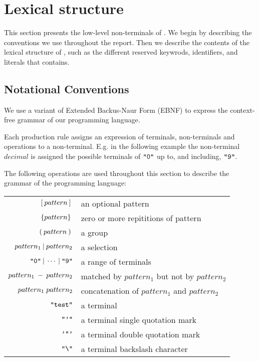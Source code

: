 \section{Lexical structure}
\label{sec:lexicalstructure}

This section presents the low-level non-terminals of \productname{}.
We begin by describing the conventions we use throughout the report. Then we
describe the contents of the lexical structure of \productname{}, such as the
different reserved keywrods, identifiers, and literals that \productname{} contains.

\subsection{Notational Conventions}
We use a variant of Extended Backus-Naur Form (EBNF) to express the context-free
grammar of our programming language.

Each production rule assigns an expression of terminals, non-terminals and operations
to a non-terminal. E.g. in the following example the non-terminal $decimal$ is assigned
the possible terminals of $\texttt{"0"}$ up to, and including, $\texttt{"9"}$.

\begin{ebnf}
\end{ebnf}

The following operations are used throughout this section to describe the
grammar of the programming language:

\begin{center}
\begin{tabular}{r l}
  $[\: pattern \:] \:$ & an optional pattern \\
  $\{pattern\} \:$ & zero or more repititions of pattern \\
  $(\: pattern \:) \:$ & a group \\
  $pattern_1 \: | \: pattern_2$ & a selection \\
  $\texttt{"0"} \: | \: \cdots \: | \: \texttt{"9"}$ & a range of terminals \\
  $pattern_1 \: - \: pattern_2$ & matched by $pattern_1$ but not by $pattern_2$\\
  $pattern_1 \; pattern_2$ & concatenation of $pattern_1$ and $pattern_2$ \\
  $\texttt{"test"}$ & a terminal \\
  $\texttt{"'"}$ & a terminal single quotation mark \\
  $\texttt{'"'}$ & a terminal double quotation mark \\
  $\texttt{"\textbackslash"}$ & a terminal backslash character \\
\end{tabular}
\end{center}

